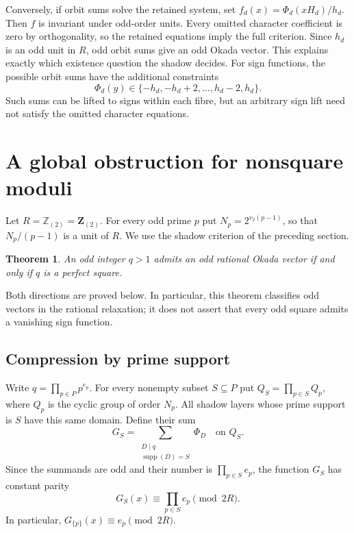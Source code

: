 \documentclass[11pt]{amsart}
\newtheorem{theorem}{Theorem}[section]
\theoremstyle{definition}
\theoremstyle{remark}
\newcommand{\Zt}{\mathbb Z_{(2)}}
\numberwithin{equation}{section}
\begin{document}
Conversely, if orbit sums solve the retained system, set
$f_d(x)=\Phi_d(xH_d)/h_d$. Then $f$ is invariant under odd-order units.
Every omitted character coefficient is zero by orthogonality, so the
retained equations imply the full criterion. Since $h_d$ is an odd unit
in $R$, odd orbit sums give an odd Okada vector. This explains exactly
which existence question the shadow decides. For sign functions, the
possible orbit sums have the additional constraints
\begin{equation}\label{eq:bounded-shadow}
 \Phi_d(y)\in\{-h_d,-h_d+2,\ldots,h_d-2,h_d\}.
\end{equation}
Such sums can be lifted to signs within each fibre, but an arbitrary
sign lift need not satisfy the omitted character equations.


\section{A global obstruction for nonsquare moduli}

Let $R=\Zt=\mathbf Z_{(2)}$. For every odd prime $p$ put
$N_p=2^{v_2(p-1)}$, so that $N_p/(p-1)$ is a unit of $R$.
We use the shadow criterion of the preceding section.

\begin{theorem}\label{thm:global-odd-obstruction}
An odd integer $q>1$ admits an odd rational Okada vector if and only if
$q$ is a perfect square.
\end{theorem}

Both directions are proved below. In particular, this
theorem classifies odd vectors in the rational relaxation; it does not
assert that every odd square admits a vanishing sign function.

\subsection{Compression by prime support}

Write $q=\prod_{p\in P}p^{e_p}$. For every nonempty subset $S\subseteq P$
put $Q_S=\prod_{p\in S}Q_p$, where $Q_p$ is the cyclic group of order
$N_p$. All shadow layers whose prime support is $S$ have this same
domain. Define their sum
\[
 G_S=\sum_{\substack{D\mid q\\\operatorname{supp}(D)=S}}\Phi_D
 \quad\text{on }Q_S.
\]
Since the summands are odd and their number is $\prod_{p\in S}e_p$,
the function $G_S$ has constant parity
\begin{equation}\label{eq:global-parity}
 G_S(x)\equiv\prod_{p\in S}e_p\pmod{2R}.
\end{equation}
In particular, $G_{\{p\}}(x)\equiv e_p\pmod{2R}$.
\end{document}
